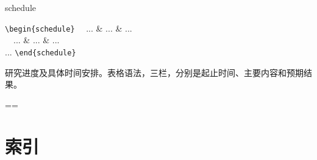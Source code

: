 \documentclass{cusdoc}
\begin{document}
\begin{function}[type=environment, added = 2024-11-10]{schedule}
  \begin{syntax}
    \verb|\begin{schedule}|
    ~~... \& ... \& ... \\
    ~~... \& ... \& ... \\
    ...
    \verb|\end{schedule}|
  \end{syntax}
  研究进度及具体时间安排。表格语法，三栏，分别是起止时间、主要内容和预期结果。
\end{function}







\cleardoublepage 
{}
  \vfuzz=\maxdimen \hfuzz=\maxdimen
\backmatter
\long\def\sectionmark#1{}
\chapter{索引}
\vskip-14pt 
\printindex 
\PrintChanges 
\PrintUsages 
\end{document}
